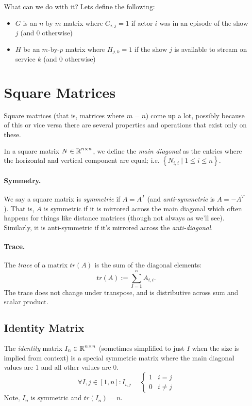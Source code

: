 What can we do with it? Lets define the following:
\begin{itemize}
\item $G$ is an $n$-by-$m$ matrix where $G_{i,j}=1$ if actor $i$ was in an episode of the show $j$ (and $0$ otherwise)
\item $H$ be an $m$-by-$p$ matrix where $H_{j,k}=1$ if the show $j$ is available to stream on service $k$ (and $0$ otherwise) 
\end{itemize}


\section{Square Matrices}
Square matrices (that is, matrices where $m=n$) come up a lot, 
possibly because of this or vice versa there are several properties and operations that exist only on these. 

In a square matrix $N\in\operatorname{\mathbb{R}}^{n\times n}$, we define the \emph{main diagonal} as the entries where the horizontal and vertical component are equal; 
i.e. $\left\{N_{i,i} \mid 1 \le i \le n\right\}$. 

\paragraph{Symmetry.}
We say a square matrix is \emph{symmetric} if $A=A^T$
(and \textit{anti-symmetric} is $A = -A^T$). 
That is, $A$ is symmetric if it is mirrored across the main diagonal which often happens for things like distance matrices (though not always as we'll see). 
Similarly, it is anti-symmetric if it's mirrored across the \textit{anti-diagonal}.

\paragraph{Trace. }
The \emph{trace} of a matrix $tr(A)$ is the sum of the diagonal elements: \[tr(A) := \sum_{I=1}^n A_{i,i}.\] 
The trace does not change under transpose, and is distributive across sum and scalar product. 

\subsection{Identity Matrix}

The \emph{identity} matrix $I_n \in\operatorname{\mathbb{R}}^{n\times n}$ (sometimes simplified to just $I$ when the size is implied from context) 
is a special symmetric matrix where the main diagonal values are $1$ and all other values are $0$.
\[
\forall I,j \in [1,n]: I_{i,j} = \begin{cases} 1 & i=j\\ 0 & i\ne j\end{cases}
\]
Note, $I_n$ is symmetric and $tr(I_n)=n$.


